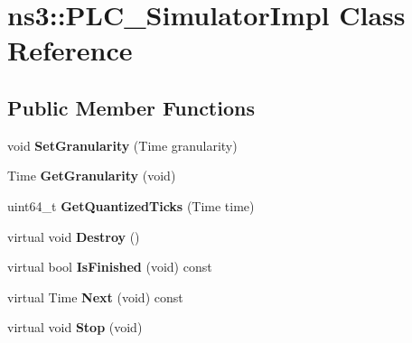 \hypertarget{classns3_1_1PLC__SimulatorImpl}{\section{ns3\-:\-:\-P\-L\-C\-\_\-\-Simulator\-Impl \-Class \-Reference}
\label{classns3_1_1PLC__SimulatorImpl}
}
\subsection*{\-Public \-Member \-Functions}
\begin{DoxyCompactItemize}
\item 
\hypertarget{classns3_1_1PLC__SimulatorImpl_a94dd23e0d6339aa3fd3474200061c0ad}{void {\bfseries \-Set\-Granularity} (\-Time granularity)}\label{classns3_1_1PLC__SimulatorImpl_a94dd23e0d6339aa3fd3474200061c0ad}

\item 
\hypertarget{classns3_1_1PLC__SimulatorImpl_ad54d47a8b1eec40d3d00663c249c44ae}{\-Time {\bfseries \-Get\-Granularity} (void)}\label{classns3_1_1PLC__SimulatorImpl_ad54d47a8b1eec40d3d00663c249c44ae}

\item 
\hypertarget{classns3_1_1PLC__SimulatorImpl_a712a6854a12aa1e7d90a0fdf82e46b8f}{uint64\-\_\-t {\bfseries \-Get\-Quantized\-Ticks} (\-Time time)}\label{classns3_1_1PLC__SimulatorImpl_a712a6854a12aa1e7d90a0fdf82e46b8f}

\item 
\hypertarget{classns3_1_1PLC__SimulatorImpl_a6312c53ea3fc7f837675d1c064414680}{virtual void {\bfseries \-Destroy} ()}\label{classns3_1_1PLC__SimulatorImpl_a6312c53ea3fc7f837675d1c064414680}

\item 
\hypertarget{classns3_1_1PLC__SimulatorImpl_a2b473f6b51cc0cc5dc5b2ee3f17760c8}{virtual bool {\bfseries \-Is\-Finished} (void) const }\label{classns3_1_1PLC__SimulatorImpl_a2b473f6b51cc0cc5dc5b2ee3f17760c8}

\item 
\hypertarget{classns3_1_1PLC__SimulatorImpl_a4e2f2169888186d5db4e67cfbaf7e951}{virtual \-Time {\bfseries \-Next} (void) const }\label{classns3_1_1PLC__SimulatorImpl_a4e2f2169888186d5db4e67cfbaf7e951}

\item 
\hypertarget{classns3_1_1PLC__SimulatorImpl_a62f8c9a7c7d759334b815485cf878d68}{virtual void {\bfseries \-Stop} (void)}\label{classns3_1_1PLC__SimulatorImpl_a62f8c9a7c7d759334b815485cf878d68}


\end{DoxyCompactItemize}

